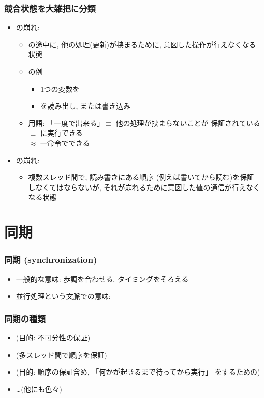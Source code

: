 \documentclass[12pt,dvipdfmx]{beamer}
\begin{document}
\begin{frame}
  \frametitle{競合状態を大雑把に分類}
  \begin{itemize}
  \item {}の崩れ:
    \begin{itemize}
    \item {}の途中に,
      他の処理(更新)が挟まるために, 意図した操作が行えなくなる状態
    \item {}の例
      \begin{itemize}
      \item 1つの変数を
      \item {}を読み出し, または書き込み
      \end{itemize}
    \item 用語: 「一度で出来る」$\equiv$ 他の処理が挟まらないことが
      保証されている $\equiv$ に実行できる \\
      $\approx$ 一命令でできる
    \end{itemize}
    
  \item {}の崩れ:
    \begin{itemize}
    \item 複数スレッド間で, 読み書きにある順序
      (例えば書いてから読む)を保証しなくてはならないが,
      それが崩れるために意図した値の通信が行えなくなる状態
    \end{itemize}    
  \end{itemize}
\end{frame}

\section{同期}
\begin{frame}
  \frametitle{同期 (synchronization)}
  \begin{itemize}
  \item 一般的な意味: 歩調を合わせる, タイミングをそろえる
  \item 並行処理という文脈での意味:
  \end{itemize}
\end{frame}

\begin{frame}
  \frametitle{同期の種類}
  \begin{itemize}
  \item {} (目的: 不可分性の保証)
  \item {} (多スレッド間で順序を保証)
  \item {} (目的:
    順序の保証含め, 「何かが起きるまで待ってから実行」
    をするための)
  \item \ldots (他にも色々)
  \end{itemize}
\end{frame}
\end{document}
